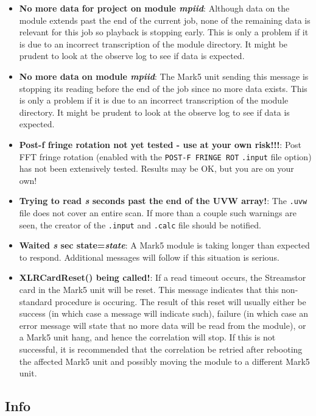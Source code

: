 \begin{itemize}
\item {\bf No more data for project on module {\it mpiid}}:
Although data on the module extends past the end of the current job, none of the remaining data is relevant for this job so playback is stopping early.
This is only a problem if it is due to an incorrect transcription of the module directory.
It might be prudent to look at the observe log to see if data is expected.

\item {\bf No more data on module {\it mpiid}}:
The Mark5 unit sending this message is stopping its reading before the end of the job since no more data exists.
This is only a problem if it is due to an incorrect transcription of the module directory.
It might be prudent to look at the observe log to see if data is expected.

\item {\bf Post-f fringe rotation not yet tested - use at your own risk!!!}:
Post FFT fringe rotation (enabled with the {\tt POST-F FRINGE  ROT} {\tt .input} file option) has not been extensively tested.
Results may be OK, but you are on your own!

\item {\bf Trying to read {\it s} seconds past the end of the UVW array!}:
The {\tt .uvw} file does not cover an entire scan.
If more than a couple such warnings are seen, the creator of the {\tt .input} and {\tt .calc} file should be notified.

\item {\bf Waited {\it s} sec state={\it state}}:
A Mark5 module is taking longer than expected to respond.
Additional messages will follow if this situation is serious.

\item {\bf XLRCardReset() being called!}:
If a read timeout occurs, the Streamstor card in the Mark5 unit will be reset.
This message indicates that this non-standard procedure is occuring.
The result of this reset will usually either be success (in which case a message will indicate such), failure (in which case an error message will state that no more data will be read from the module), or a Mark5 unit hang, and hence the correlation will stop.
If this is not successful, it is recommended that the correlation be retried after rebooting the affected Mark5 unit and possibly moving the module to a different Mark5 unit.

\end{itemize}

\subsection{Info}

